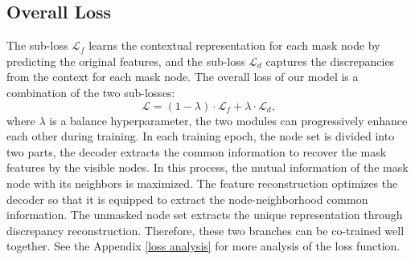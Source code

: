 \documentclass[sigconf]{acmart}
\begin{document}
\subsection{Overall Loss}
The sub-loss $\mathcal{L}_f$ learns the contextual representation for each mask node by predicting the original features, and the sub-loss $\mathcal{L}_d$ captures the discrepancies from the context for each mask node. The overall loss of our model is a combination of the two sub-losses:
\begin{equation}
    \mathcal{L} = (1-\lambda) \cdot \mathcal{L}_f + \lambda \cdot \mathcal{L}_d,
\label{eq.13}
\end{equation}
where $\lambda$ is a balance hyperparameter, the two modules can progressively enhance each other during training. In each training epoch, the node set is divided into two parts, the decoder extracts the common information to recover the mask features by the visible nodes. In this process, the mutual information of the mask node with its neighbors is maximized. The feature reconstruction optimizes the decoder so that it is equipped to extract the node-neighborhood common information. The unmasked node set extracts the unique representation through discrepancy reconstruction. Therefore, these two branches can be co-trained well together. See the Appendix \ref{loss analysis} for more analysis of the loss function.
\end{document}
